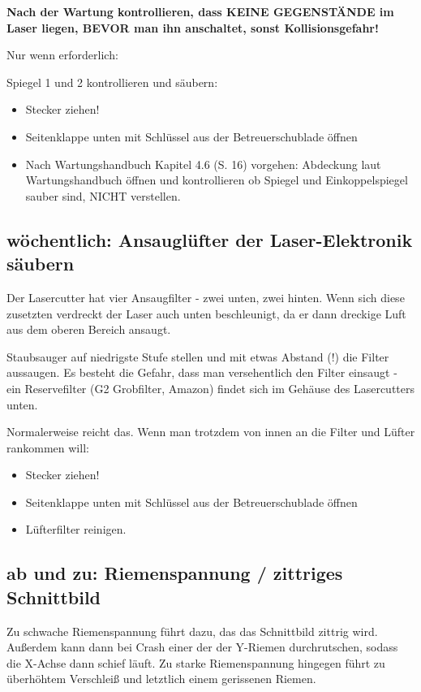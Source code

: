 \documentclass{\basedir/fablab-document}
\begin{document}
\textbf{Nach der Wartung kontrollieren, dass KEINE GEGENSTÄNDE im Laser liegen, BEVOR man ihn anschaltet, sonst Kollisionsgefahr!}
	
	Nur wenn erforderlich:
	
	Spiegel 1 und 2 kontrollieren und säubern:
	\begin{itemize}
		\item Stecker ziehen!
		\item Seitenklappe unten mit Schlüssel aus der Betreuerschublade öffnen
		\item Nach Wartungshandbuch Kapitel 4.6 (S. 16) vorgehen: Abdeckung laut Wartungshandbuch öffnen und kontrollieren ob Spiegel und Einkoppelspiegel sauber sind, NICHT verstellen.
	\end{itemize}

	
\subsection{wöchentlich: Ansauglüfter der Laser-Elektronik säubern}
	Der Lasercutter hat vier Ansaugfilter - zwei unten, zwei hinten. Wenn sich diese zusetzten verdreckt der Laser auch unten beschleunigt, da er dann dreckige Luft aus dem oberen Bereich ansaugt.
	
	 Staubsauger auf niedrigste Stufe stellen und mit etwas Abstand (!) die Filter aussaugen. Es besteht die Gefahr, dass man versehentlich den Filter einsaugt - ein Reservefilter (G2 Grobfilter, Amazon) findet sich im Gehäuse des Lasercutters unten.
	
	Normalerweise reicht das. Wenn man trotzdem von innen an die Filter und Lüfter rankommen will:
	\begin{itemize}
		\item Stecker ziehen!
		\item Seitenklappe unten mit Schlüssel aus der Betreuerschublade öffnen
		\item Lüfterfilter reinigen.
	\end{itemize}
	
\subsection{ab und zu: Riemenspannung / zittriges Schnittbild}
	Zu schwache Riemenspannung führt dazu, das das Schnittbild zittrig wird. Außerdem kann dann bei Crash einer der der Y-Riemen durchrutschen, sodass die X-Achse dann schief läuft. Zu starke Riemenspannung hingegen führt zu überhöhtem Verschleiß und letztlich einem gerissenen Riemen.
	
\end{document}
